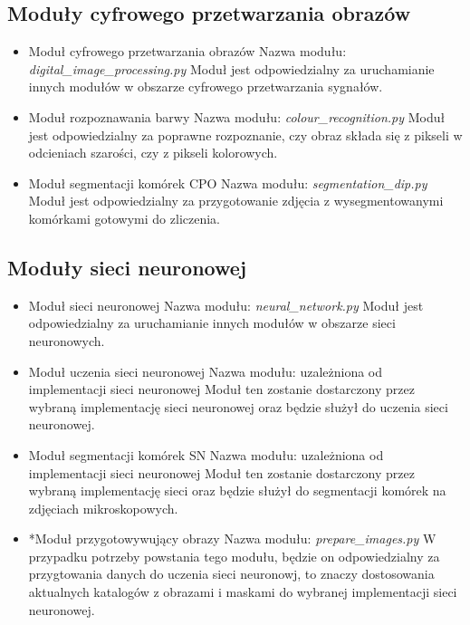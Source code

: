 \documentclass[a4paper]{article}
\begin{document}
\subsection{Moduły cyfrowego przetwarzania obrazów}
\begin{itemize}
    \item Moduł cyfrowego przetwarzania obrazów
    \newline
    Nazwa modułu: \textit{digital\_image\_processing.py}
    \newline
    Moduł jest odpowiedzialny za uruchamianie innych modułów w obszarze cyfrowego przetwarzania sygnałów.
    \item Moduł rozpoznawania barwy 
    \newline
    Nazwa modułu: \textit{colour\_recognition.py}
    \newline
    Moduł jest odpowiedzialny za poprawne rozpoznanie, czy obraz składa się z pikseli w odcieniach szarości, czy z pikseli kolorowych. 
    \item Moduł segmentacji komórek CPO
    \newline
    Nazwa modułu: \textit{segmentation\_dip.py}
    \newline
    Moduł jest odpowiedzialny za przygotowanie zdjęcia z wysegmentowanymi komórkami gotowymi do zliczenia.
\end{itemize}
\subsection{Moduły sieci neuronowej}
\begin{itemize}
    \item Moduł sieci neuronowej
    \newline
    Nazwa modułu: \textit{neural\_network.py}
    \newline
    Moduł jest odpowiedzialny za uruchamianie innych modułów w obszarze sieci neuronowych.
    \item Moduł uczenia sieci neuronowej
    \newline
    Nazwa modułu: uzależniona od implementacji sieci neuronowej
    \newline
    Moduł ten zostanie dostarczony przez wybraną implementację sieci neuronowej oraz będzie służył do uczenia sieci neuronowej.
    \item Moduł segmentacji komórek SN
    \newline
    Nazwa modułu: uzależniona od implementacji sieci neuronowej
    \newline
    Moduł ten zostanie dostarczony przez wybraną implementację sieci oraz będzie służył do segmentacji komórek na zdjęciach mikroskopowych.
    \item *Moduł przygotowywujący obrazy
    \newline
    Nazwa modułu: \textit{prepare\_images.py}
    \newline
    W przypadku potrzeby powstania tego modułu, będzie on odpowiedzialny za przygtowania danych do uczenia sieci neuronowj, to znaczy dostosowania aktualnych katalogów z obrazami i maskami do wybranej implementacji sieci neuronowej.
\end{itemize}
\end{document}

